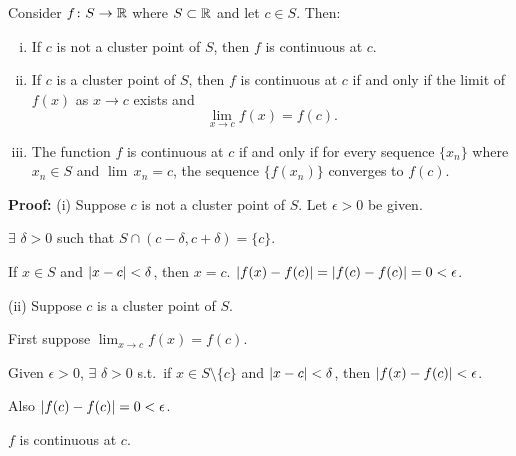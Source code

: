 \documentclass[10pt,aspectratio=149]{beamer}
\begin{document}
\begin{frame}

\begin{proposition}
Consider $f \colon S \to {\mathbb{R}}$ where $S \subset {\mathbb{R}}$
and let $c \in S$.
\pause
Then:
\begin{enumerate}[(i)]
\item If $c$ is not a cluster point of $S$, then $f$ is continuous at $c$.
\item \pause If $c$ is a cluster point of $S$, then $f$ is continuous at $c$
if and only if the limit of $f(x)$ as $x \to c$ exists and
\begin{equation*}
\lim_{x\to c} f(x) = f(c) .
\end{equation*}
\item \pause The function $f$ is continuous at $c$ if and only if for every sequence $\{ x_n \}$
where $x_n \in S$ and $\lim\, x_n = c$, the sequence $\{ f(x_n) \}$ converges
to $f(c)$.
\end{enumerate}
\end{proposition}

\pause

\textbf{Proof:}
(i) Suppose $c$ is not a cluster point of $S$.  Let $\epsilon > 0$ be given.

\pause
$\exists$ $\delta > 0$ such that $S \cap (c-\delta,c+\delta) = \{ c \}$.

\pause
If $x \in S$ and $\left\lvert {x-c} \right\rvert < \delta$, then $x=c$.
\pause
\wthus $\left\lvert {f(x)-f(c)} \right\rvert = \left\lvert {f(c)-f(c)} \right\rvert = 0 < \epsilon$.

\pause
\medskip

(ii)
Suppose $c$ is a cluster point of $S$.

\pause
First suppose $\lim_{x\to c} f(x) = f(c)$.

\pause
Given $\epsilon > 0$, $\exists$ $\delta > 0$ s.t.\ if $x \in S \setminus \{ c \}$
and $\left\lvert {x-c} \right\rvert < \delta$, then $\left\lvert {f(x)-f(c)} \right\rvert < \epsilon$.

\pause
Also $\left\lvert {f(c)-f(c)} \right\rvert = 0 < \epsilon$.

\pause
\thus \quad $f$ is continuous at $c$.

\end{frame}
\end{document}
